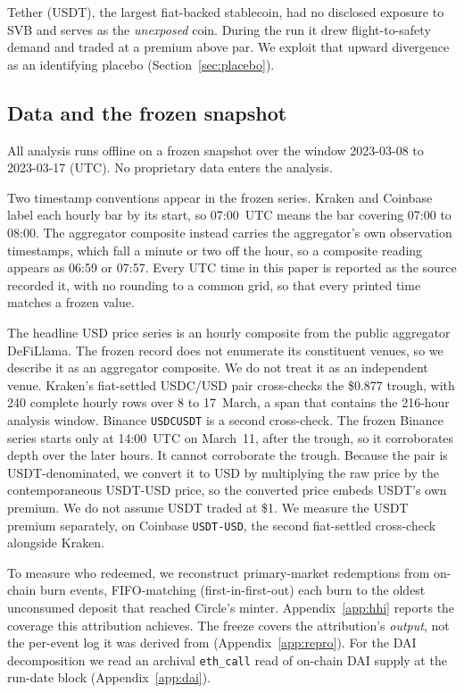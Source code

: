 Tether (USDT), the largest fiat-backed stablecoin, had no disclosed exposure to SVB and
serves as the \emph{unexposed} coin. During the run it drew flight-to-safety demand and
traded at a premium above par. We exploit that upward divergence as an identifying placebo
(Section~\ref{sec:placebo}).

\subsection{Data and the frozen snapshot}
All analysis runs offline on a frozen snapshot over the window 2023-03-08 to 2023-03-17
(UTC). No proprietary data enters the analysis.

Two timestamp conventions appear in the frozen series. Kraken and Coinbase label each
hourly bar by its start, so 07:00~UTC means the bar covering 07:00 to 08:00. The aggregator
composite instead carries the aggregator's own observation timestamps, which fall a minute
or two off the hour, so a composite reading appears as 06{:}59 or 07{:}57. Every UTC time in
this paper is reported as the source recorded it, with no rounding to a common grid, so that
every printed time matches a frozen value.

The headline USD price series is an hourly composite from the public aggregator DeFiLlama.
The frozen record does not enumerate its constituent venues, so we describe it as an
aggregator composite. We do not treat it as an independent venue. Kraken's fiat-settled
USDC/USD pair cross-checks the \$0.877 trough, with 240 complete hourly rows over 8 to
17~March, a span that contains the 216-hour analysis window. Binance \texttt{USDCUSDT} is a
second cross-check. The frozen Binance series starts only at 14:00~UTC on March~11, after
the trough, so it corroborates depth over the later hours. It cannot corroborate the trough.
Because the pair is USDT-denominated, we convert it to USD by multiplying the raw price by
the contemporaneous USDT-USD price, so the converted price embeds USDT's own premium. We do
not assume USDT traded at \$1. We measure the USDT premium separately, on Coinbase
\texttt{USDT-USD}, the second fiat-settled cross-check alongside Kraken.

To measure who redeemed, we reconstruct primary-market redemptions from on-chain burn
events, FIFO-matching (first-in-first-out) each burn to the oldest unconsumed deposit that
reached Circle's minter. Appendix~\ref{app:hhi} reports the coverage this attribution achieves.
The freeze covers the attribution's \emph{output}, not the per-event log it was derived
from (Appendix~\ref{app:repro}). For the DAI decomposition we read
an archival \texttt{eth\_call} read of on-chain DAI supply at the run-date block
(Appendix~\ref{app:dai}).

